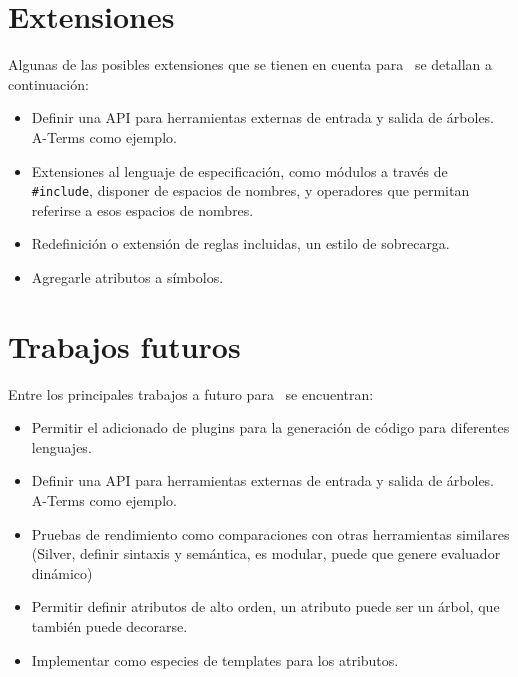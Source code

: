 \section{Extensiones}
Algunas de las posibles extensiones que se tienen en cuenta para \maggen\ se detallan a continuación:
\begin{itemize}
\item Definir una API para herramientas externas de entrada y salida de árboles. A-Terms como ejemplo.
\item Extensiones al lenguaje de especificación, como módulos a través de \texttt{\#include}, disponer de espacios de nombres, y operadores que permitan referirse a esos espacios de nombres.
\item Redefinición o extensión de reglas incluidas, un estilo de sobrecarga.
\item Agregarle atributos a símbolos.
\end{itemize}

\section{Trabajos futuros}
Entre los principales trabajos a futuro para \maggen\ se encuentran:
\begin{itemize}
\item Permitir el adicionado de plugins para la generación de código para diferentes lenguajes.
\item Definir una API para herramientas externas de entrada y salida de árboles. A-Terms como ejemplo.
\item Pruebas de rendimiento como comparaciones con otras herramientas similares (Silver, definir sintaxis y semántica, es modular, puede que genere evaluador dinámico)

\item Permitir definir atributos de alto orden, un atributo puede ser un árbol, que también puede decorarse.
\item Implementar como especies de templates para los atributos.

\end{itemize}